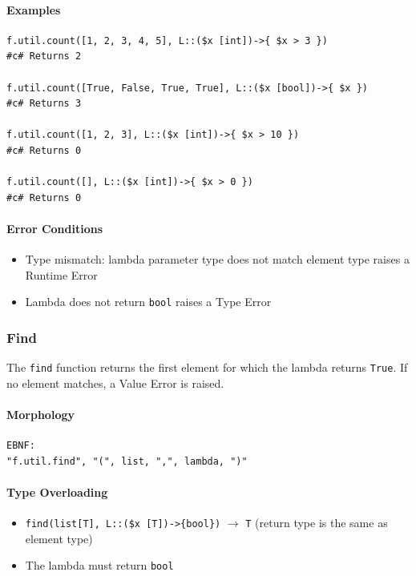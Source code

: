 \paragraph{Examples}
\begin{verbatim}
f.util.count([1, 2, 3, 4, 5], L::($x [int])->{ $x > 3 })
#c# Returns 2

f.util.count([True, False, True, True], L::($x [bool])->{ $x })
#c# Returns 3

f.util.count([1, 2, 3], L::($x [int])->{ $x > 10 })
#c# Returns 0

f.util.count([], L::($x [int])->{ $x > 0 })
#c# Returns 0
\end{verbatim}

\paragraph{Error Conditions}
\begin{itemize}
\item Type mismatch: lambda parameter type does not match element type raises a Runtime Error
\item Lambda does not return \texttt{bool} raises a Type Error
\end{itemize}

\subsubsection{Find}
The \texttt{find} function returns the first element for which the lambda returns \texttt{True}. If no element matches, a Value Error is raised.

\paragraph{Morphology}
\begin{verbatim}
EBNF:
"f.util.find", "(", list, ",", lambda, ")"
\end{verbatim}

\paragraph{Type Overloading}
\begin{itemize}
\item \texttt{find(list[T], L::(\$x [T])->\{bool\})} $\rightarrow$ \texttt{T}
  (return type is the same as element type)
\item The lambda must return \texttt{bool}
\end{itemize}

